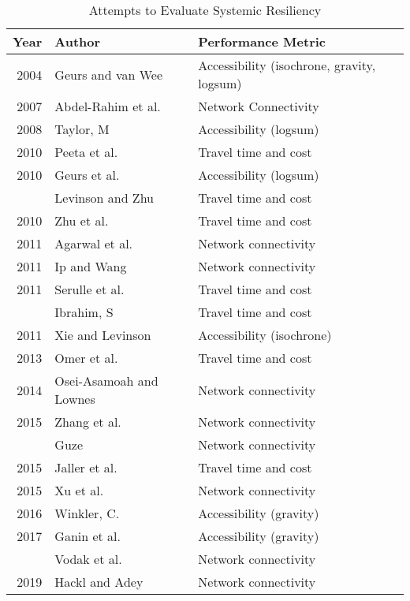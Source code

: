 \documentclass[
  letterpaper,
  number,
  review,
  3p]{elsarticle}
\begin{document}
\hypertarget{tbl-authortable}{}
\begin{table}
\caption{\label{tbl-authortable}Attempts to Evaluate Systemic Resiliency }\tabularnewline

\centering
\begin{tabular}[t]{rll}
\toprule
Year & Author & Performance Metric\\
\midrule
2004 & Geurs and van Wee & Accessibility (isochrone, gravity, logsum)\\
2007 & Abdel-Rahim et al. & Network Connectivity\\
2008 & Taylor, M & Accessibility (logsum)\\
2010 & Peeta et al. & Travel time and cost\\
2010 & Geurs et al. & Accessibility (logsum)\\
\addlinespace
2010 & Levinson and Zhu & Travel time and cost\\
2010 & Zhu et al. & Travel time and cost\\
2011 & Agarwal et al. & Network connectivity\\
2011 & Ip and Wang & Network connectivity\\
2011 & Serulle et al. & Travel time and cost\\
\addlinespace
2011 & Ibrahim, S & Travel time and cost\\
2011 & Xie and Levinson & Accessibility (isochrone)\\
2013 & Omer et al. & Travel time and cost\\
2014 & Osei-Asamoah and Lownes & Network connectivity\\
2015 & Zhang et al. & Network connectivity\\
\addlinespace
2015 & Guze & Network connectivity\\
2015 & Jaller et al. & Travel time and cost\\
2015 & Xu et al. & Network connectivity\\
2016 & Winkler, C. & Accessibility (gravity)\\
2017 & Ganin et al. & Accessibility (gravity)\\
\addlinespace
2019 & Vodak et al. & Network connectivity\\
2019 & Hackl and Adey & Network connectivity\\
\bottomrule
\end{tabular}
\end{table}
\end{document}
